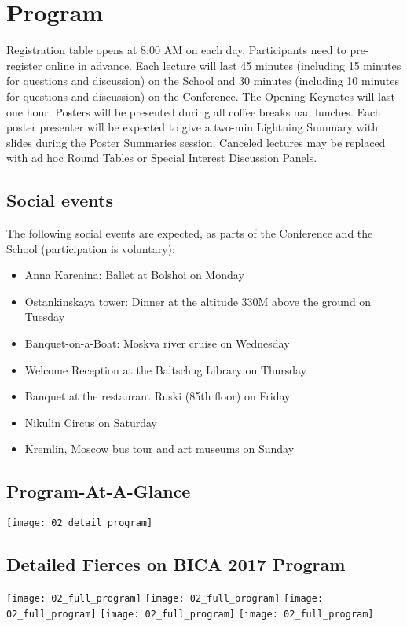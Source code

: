 \documentclass[10pt,fleqn,openany]{book} %
\begin{document}

\chapter{Program}

Registration table opens at 8:00 AM on each day. Participants need to pre-register online in advance. Each lecture will last 45 minutes (including 15 minutes for questions and discussion) on the School and 30 minutes (including 10 minutes for questions and discussion) on the Conference. The Opening Keynotes will last one hour. Posters will be presented during all coffee breaks nad lunches. Each poster presenter will be expected to give a two-min Lightning Summary with slides during the Poster Summaries session. Canceled lectures may be replaced with ad hoc Round Tables or Special Interest Discussion Panels.

\section{Social events}
    The following social events are expected, as parts of the Conference and the School (participation is voluntary):
\begin{itemize}
    \item Anna Karenina: Ballet at Bolshoi on Monday
    \item Ostankinskaya tower: Dinner at the altitude 330M above the ground	on Tuesday
    \item Banquet-on-a-Boat: Moskva river cruise on Wednesday
    \item Welcome Reception at the Baltschug Library on Thursday
    \item Banquet at the restaurant	Ruski (85th floor) on Friday
    \item Nikulin Circus on Saturday
    \item Kremlin, Moscow bus tour and art museums on Sunday
\end{itemize}
\vfill

\section{Program-At-A-Glance}
	\vspace{10pt}
	\texttt{[image: 02\_detail\_program]}
	\vfill
	

\section{Detailed Fierces on BICA 2017 Program}
	\texttt{[image: 02\_full\_program]}
	\vfill
	\texttt{[image: 02\_full\_program]}
	\vfill
	\texttt{[image: 02\_full\_program]}
	\vfill
	\texttt{[image: 02\_full\_program]}
	\vfill
	\texttt{[image: 02\_full\_program]}
	\vfill
\end{document}
